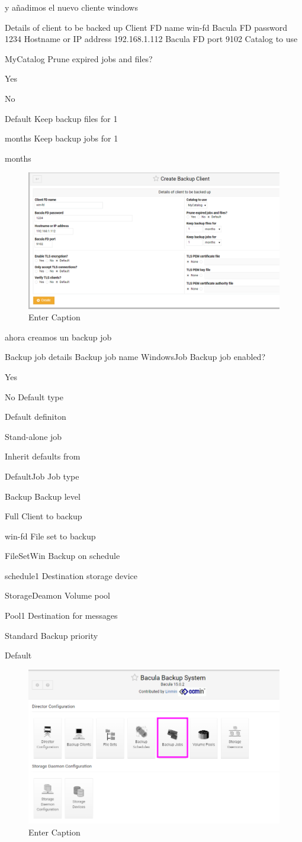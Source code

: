 y añadimos el nuevo cliente windows

Details of client to be backed up
Client FD name
win-fd
Bacula FD password
1234
Hostname or IP address
192.168.1.112
Bacula FD port
9102
Catalog to use

MyCatalog
Prune expired jobs and files?

  Yes 
 
  No 
 
  Default 
Keep backup files for
1
 
months
Keep backup jobs for
1
 
months
\begin{figure}[H]
    \centering
    \includegraphics[width=0.5\linewidth]{instalacionBacula/createbackupclientwindows.png}
    \caption{Enter Caption}
\end{figure}


ahora creamos un backup job


Backup job details
Backup job name
WindowsJob
Backup job enabled?

  Yes 
 
  No 
Default type

  Default definiton 
 
  Stand-alone job 
 
  Inherit defaults from 

DefaultJob
Job type

Backup
Backup level

Full
Client to backup

win-fd
File set to backup

FileSetWin
Backup on schedule

schedule1
Destination storage device

StorageDeamon
Volume pool

Pool1
Destination for messages

Standard
Backup priority

  Default 
 
 \begin{figure}[H]
    \centering
    \includegraphics[width=0.5\linewidth]{instalacionBacula/createJOB.png}
    \caption{Enter Caption}
\end{figure}

